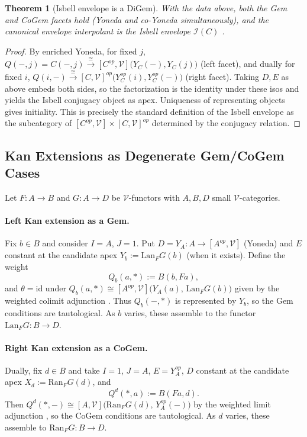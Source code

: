 \documentclass[11pt]{article}
\theoremstyle{plain}
\newtheorem{theorem}{Theorem}[section]
\theoremstyle{definition}
\theoremstyle{remark}
\newcommand{\V}{\mathcal{V}}
\newcommand{\Ran}{\mathrm{Ran}}
\newcommand{\Lan}{\mathrm{Lan}}
\begin{document}
\begin{theorem}[Isbell envelope is a DiGem]\label{thm:isbell-digem}
With the data above, both the Gem and CoGem facets hold (Yoneda and co-Yoneda simultaneously), and the canonical envelope interpolant is the Isbell envelope $\mathcal{I}(C)$ \cite{isbell1960adequate,kelly1982basic}.
\end{theorem}

\begin{proof}
By enriched Yoneda, for fixed $j$, $Q(-,j)=C(-,j)\xrightarrow{\ \cong\ }[C^{op},\V]\big(Y_C(-),Y_C(j)\big)$ (left facet), and dually for fixed $i$, $Q(i,-)\xrightarrow{\ \cong\ }[C,\V]^{op}\big(Y_C^{op}(i),Y_C^{op}(-)\big)$ (right facet). Taking $D,E$ as above embeds both sides, so the factorization is the identity under these isos and yields the Isbell conjugacy object as apex. Uniqueness of representing objects gives initiality. This is precisely the standard definition of the Isbell envelope as the subcategory of $[C^{op},\V]\times [C,\V]^{op}$ determined by the conjugacy relation.
\end{proof}

\subsection{Kan Extensions as Degenerate Gem/CoGem Cases}\label{ssec:gem-kan}

Let $F:A\to B$ and $G:A\to D$ be $\V$-functors with $A,B,D$ small $\V$-categories.

\paragraph{Left Kan extension as a Gem.}
Fix $b\in B$ and consider $I=A$, $J=1$. Put $D=Y_A:A\to [A^{op},\V]$ (Yoneda) and $E$ constant at the candidate apex $Y_b:=\Lan_F G(b)$ (when it exists). Define the weight
$$
Q_b(a,*) := B(b,F a),
$$
and
\(
\theta=\mathrm{id}
\)
under
\(
Q_b(a,*)\cong [A^{op},\V]\big(Y_A(a),\,\Lan_F G(b)\big)
\)
given by the weighted colimit adjunction \cite{kelly1982basic}. Thus $Q_b(-,*)$ is represented by $Y_b$, so the Gem conditions are tautological. As $b$ varies, these assemble to the functor $\Lan_F G:B\to D$.

\paragraph{Right Kan extension as a CoGem.}
Dually, fix $d\in B$ and take $I=1$, $J=A$, $E=Y_A^{op}$, $D$ constant at the candidate apex $X_d:=\Ran_F G(d)$, and
$$
Q^d(*,a) := B(Fa,d).
$$
Then
\(
Q^d(*,-)\cong [A,\V]\big(\Ran_F G(d),\,Y_A^{op}(-)\big)
\)
by the weighted limit adjunction \cite{kelly1982basic}, so the CoGem conditions are tautological. As $d$ varies, these assemble to $\Ran_F G:B\to D$.
\end{document}

